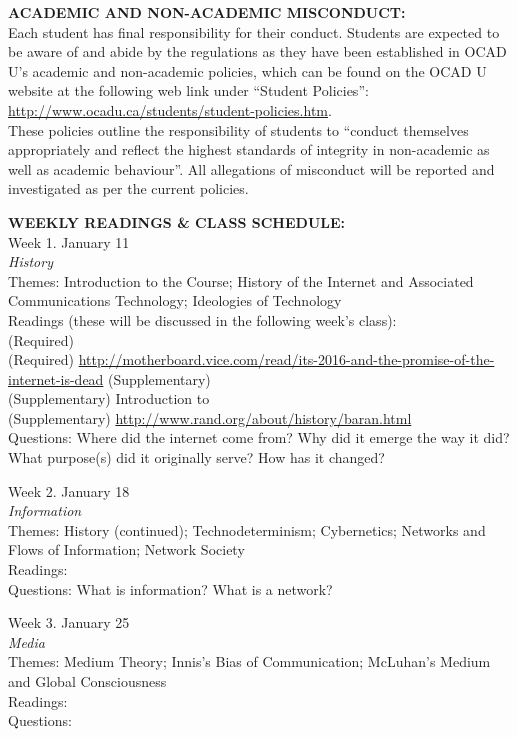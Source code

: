 \documentclass[10pt]{article}
\begin{document}
\textbf{ACADEMIC AND NON-ACADEMIC MISCONDUCT:}\\
Each student has final responsibility for their conduct. Students are expected to be aware of and abide by the regulations as they have been established in OCAD U’s academic and non-academic policies, which can be found on the OCAD U website at the following web link under “Student Policies”:\\ \url{http://www.ocadu.ca/students/student-policies.htm}.\\ These policies outline the responsibility of students to “conduct themselves appropriately and reflect the highest standards of integrity in non-academic as well as academic behaviour”. All allegations of misconduct will be reported and investigated as per the current policies.

\textbf{WEEKLY READINGS \& CLASS SCHEDULE:}\\
Week 1. January 11 \\
\textit{History} \\
Themes: Introduction to the Course; History of the Internet and Associated Communications Technology; Ideologies of Technology \\
Readings (these will be discussed in the following week's class): \\
(Required)  \\
(Required) \url{http://motherboard.vice.com/read/its-2016-and-the-promise-of-the-internet-is-dead}
(Supplementary)  \\
(Supplementary) Introduction to  \\
(Supplementary) \url{http://www.rand.org/about/history/baran.html} \\
Questions: Where did the internet come from? Why did it emerge the way it did? What purpose(s) did it originally serve? How has it changed?

Week 2. January 18 \\
\textit{Information} \\
Themes: History (continued); Technodeterminism; Cybernetics; Networks and Flows of Information; Network Society \\
Readings: \\
Questions: What is information? What is a network?

Week 3. January 25 \\
\textit{Media} \\
Themes: Medium Theory; Innis’s Bias of Communication; McLuhan’s Medium and Global Consciousness \\
Readings: \\ 
Questions: 
\end{document}
